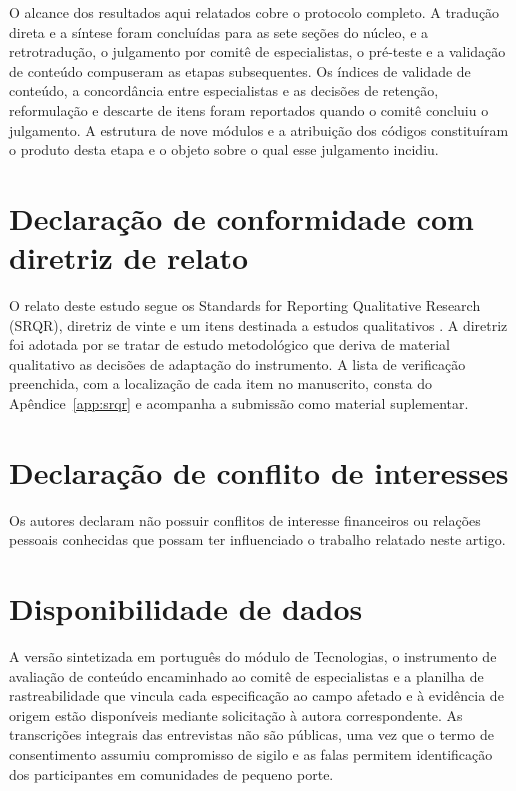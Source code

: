 \documentclass[preprint,authoryear,12pt]{elsarticle}
\begin{document}
O alcance dos resultados aqui relatados cobre o protocolo completo. A tradução direta e a síntese foram concluídas para as sete seções do núcleo, e a retrotradução, o julgamento por comitê de especialistas, o pré-teste e a validação de conteúdo compuseram as etapas subsequentes. Os índices de validade de conteúdo, a concordância entre especialistas e as decisões de retenção, reformulação e descarte de itens foram reportados quando o comitê concluiu o julgamento. A estrutura de nove módulos e a atribuição dos códigos constituíram o produto desta etapa e o objeto sobre o qual esse julgamento incidiu.


\section*{Declaração de conformidade com diretriz de relato}

O relato deste estudo segue os Standards for Reporting Qualitative Research (SRQR), diretriz de vinte e um itens destinada a estudos qualitativos \citep{OBrien2014}. A diretriz foi adotada por se tratar de estudo metodológico que deriva de material qualitativo as decisões de adaptação do instrumento. A lista de verificação preenchida, com a localização de cada item no manuscrito, consta do Apêndice~\ref{app:srqr} e acompanha a submissão como material suplementar.

\section*{Declaração de conflito de interesses}

Os autores declaram não possuir conflitos de interesse financeiros ou relações pessoais conhecidas que possam ter influenciado o trabalho relatado neste artigo.

\section*{Disponibilidade de dados}

A versão sintetizada em português do módulo de Tecnologias, o instrumento de avaliação de conteúdo encaminhado ao comitê de especialistas e a planilha de rastreabilidade que vincula cada especificação ao campo afetado e à evidência de origem estão disponíveis mediante solicitação à autora correspondente. As transcrições integrais das entrevistas não são públicas, uma vez que o termo de consentimento assumiu compromisso de sigilo e as falas permitem identificação dos participantes em comunidades de pequeno porte.
\end{document}
